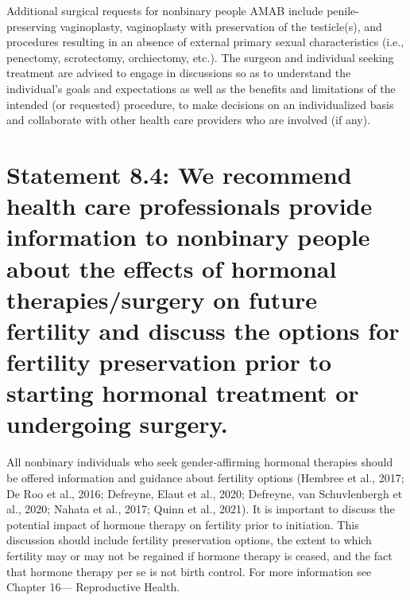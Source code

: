 \documentclass[
]{book}
\begin{document}
Additional surgical requests for nonbinary people AMAB include penile-preserving vaginoplasty,
vaginoplasty with preservation of the testicle(s),
and procedures resulting in an absence of external primary sexual characteristics (i.e., penectomy, scrotectomy, orchiectomy, etc.). The surgeon
and individual seeking treatment are advised to
engage in discussions so as to understand the
individual's goals and expectations as well as the
benefits and limitations of the intended (or
requested) procedure, to make decisions on an
individualized basis and collaborate with other
health care providers who are involved (if any).

\hypertarget{statement-8.4-we-recommend-health-care-professionals-provide-information-to-nonbinary-people-about-the-effects-of-hormonal-therapiessurgery-on-future-fertility-and-discuss-the-options-for-fertility-preservation-prior-to-starting-hormonal-treatment-or-undergoing-surgery.}{%
\section*{Statement 8.4: We recommend health care professionals provide information to nonbinary people about the effects of hormonal therapies/surgery on future fertility and discuss the options for fertility preservation prior to starting hormonal treatment or undergoing surgery.}\label{statement-8.4-we-recommend-health-care-professionals-provide-information-to-nonbinary-people-about-the-effects-of-hormonal-therapiessurgery-on-future-fertility-and-discuss-the-options-for-fertility-preservation-prior-to-starting-hormonal-treatment-or-undergoing-surgery.}}

All nonbinary individuals who seek
gender-affirming hormonal therapies should be
offered information and guidance about fertility
options (Hembree et al., 2017; De Roo et al.,
2016; Defreyne, Elaut et al., 2020; Defreyne, van
Schuvlenbergh et al., 2020; Nahata et al., 2017;
Quinn et al., 2021). It is important to discuss
the potential impact of hormone therapy on fertility prior to initiation. This discussion should
include fertility preservation options, the extent
to which fertility may or may not be regained
if hormone therapy is ceased, and the fact that
hormone therapy per se is not birth control. For
more information see Chapter 16---
Reproductive Health.
\end{document}
